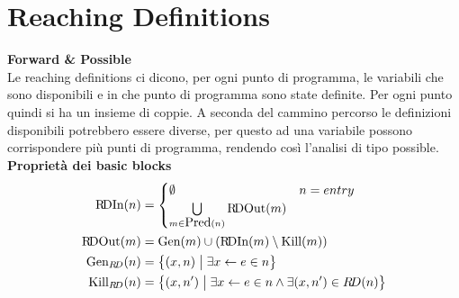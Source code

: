 \documentclass[a4paper,12pt,openany]{article}
\newcommand{\RD}{R\!D}
\begin{document}
    \clearpage\section*{Reaching Definitions}
    \textbf{Forward \& Possible}\\[1em]
    Le reaching definitions ci dicono, per ogni punto di programma, le variabili che sono disponibili e in che punto di programma sono state definite. Per ogni punto quindi si ha un insieme di coppie. A seconda del cammino percorso le definizioni disponibili potrebbero essere diverse, per questo ad una variabile possono corrispondere più punti di programma, rendendo così l'analisi di tipo possible.
    \\[1em]
    
    \noindent\textbf{Proprietà dei basic blocks}
    \begin{align*}
        \mbox{\RD In}(n) &=
        \begin{cases}
            \emptyset & n = entry\\
            \bigcup\limits_{m\in \mbox{Pred}(n)} \mbox{\RD Out}(m)
        \end{cases}\\
        \mbox{\RD Out}(m) &= \mbox{Gen}(m) \cup (\mbox{\RD In}(m) \setminus \mbox{Kill}(m))\\
        \mbox{Gen}_{\RD}(n) &= \left\{
            (x,n) \;\big\vert\; \exists x\leftarrow e \in n
        \right\}\\
        \mbox{Kill}_{\RD}(n) &= \left\{
            (x,n') \;\big\vert\; \exists x\leftarrow e \in n \land \exists (x,n')\in\RD(n)
        \right\}
    \end{align*}
    
\end{document}
